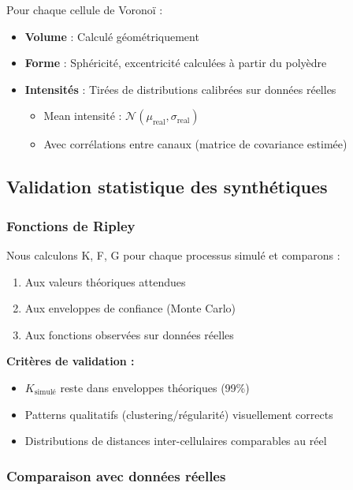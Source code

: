 Pour chaque cellule de Voronoï :
\begin{itemize}
    \item \textbf{Volume} : Calculé géométriquement
    \item \textbf{Forme} : Sphéricité, excentricité calculées à partir du polyèdre
    \item \textbf{Intensités} : Tirées de distributions calibrées sur données réelles
    \begin{itemize}
        \item Mean intensité : $\mathcal{N}(\mu_{\text{real}}, \sigma_{\text{real}})$
        \item Avec corrélations entre canaux (matrice de covariance estimée)
    \end{itemize}
\end{itemize}

\subsection{Validation statistique des synthétiques}

\subsubsection{Fonctions de Ripley}

Nous calculons K, F, G pour chaque processus simulé et comparons :
\begin{enumerate}
    \item Aux valeurs théoriques attendues
    \item Aux enveloppes de confiance (Monte Carlo)
    \item Aux fonctions observées sur données réelles
\end{enumerate}

\textbf{Critères de validation :}
\begin{itemize}
    \item $K_{\text{simulé}}$ reste dans enveloppes théoriques (99\%)
    \item Patterns qualitatifs (clustering/régularité) visuellement corrects
    \item Distributions de distances inter-cellulaires comparables au réel
\end{itemize}

\subsubsection{Comparaison avec données réelles}

